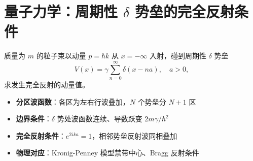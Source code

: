 \section{量子力学：周期性 $\delta$ 势垒的完全反射条件}
\label{sec:periodic-delta-reflection}

\begin{modelbox}
质量为 $m$ 的粒子束以动量 $p=\hbar k$ 从 $x=-\infty$ 入射，碰到周期性 $\delta$ 势垒
\[
V(x)=\gamma\sum_{n=0}^{\infty}\delta(x-na),\quad a>0,
\]
求发生完全反射的动量值。
\end{modelbox}

\begin{tipbox}[考点快速分析]
\begin{itemize}
    \item \textbf{分区波函数}：各区为左右行波叠加，$N$ 个势垒分 $N+1$ 区
    \item \textbf{边界条件}：$\delta$ 势处波函数连续、导数跃变 $2m\gamma/\hbar^2$
    \item \textbf{完全反射条件}：$e^{2ika}=1$，相邻势垒反射波同相叠加
    \item \textbf{物理对应}：Kronig-Penney 模型禁带中心、Bragg 反射条件
\end{itemize}
\end{tipbox}

